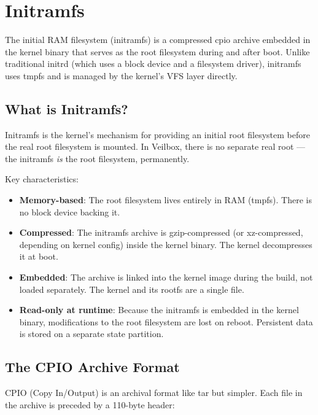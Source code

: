 \chapter{Initramfs}
\label{ch:initramfs}

The initial RAM filesystem (initramfs) is a compressed cpio archive
embedded in the kernel binary that serves as the root filesystem during
and after boot. Unlike traditional initrd (which uses a block device and
a filesystem driver), initramfs uses tmpfs and is managed by the kernel's
VFS layer directly.

\section{What is Initramfs?}

Initramfs is the kernel's mechanism for providing an initial root
filesystem before the real root filesystem is mounted. In Veilbox,
there is no separate real root — the initramfs \emph{is} the root
filesystem, permanently.

Key characteristics:
\begin{itemize}[nosep]
  \item \textbf{Memory-based}: The root filesystem lives entirely in RAM
        (tmpfs). There is no block device backing it.
  \item \textbf{Compressed}: The initramfs archive is gzip-compressed
        (or xz-compressed, depending on kernel config) inside the kernel
        binary. The kernel decompresses it at boot.
  \item \textbf{Embedded}: The archive is linked into the kernel image
        during the build, not loaded separately. The kernel and its
        rootfs are a single file.
  \item \textbf{Read-only at runtime}: Because the initramfs is embedded
        in the kernel binary, modifications to the root filesystem are
        lost on reboot. Persistent data is stored on a separate state
        partition.
\end{itemize}

\section{The CPIO Archive Format}

CPIO (Copy In/Output) is an archival format like tar but simpler. Each
file in the archive is preceded by a 110-byte header:

